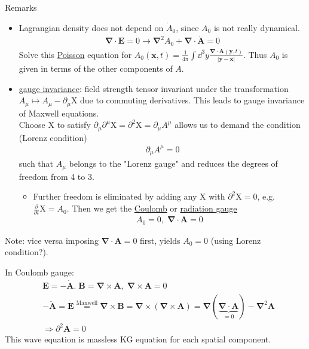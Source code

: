 Remarks
\begin{itemize}
	\item Lagrangian density does not depend on $\dot{A}_0$, since $A_0$ is not really dynamical.
	\begin{align*}
		\pmb{\nabla}\cdot \pmb{E} = 0 \rightarrow \pmb{\nabla}^2 A_0 + \pmb{\nabla}\cdot \dot{\pmb{A}} = 0 
	\end{align*}
	Solve this \underline{Poisson} equation for $A_0(\pmb{x},t) = \frac{1}{4\pi}\int \dd^3 y \frac{\pmb{\nabla}\cdot \dot{\pmb{A}}(\pmb{y},t)}{|\pmb{y}-\pmb{x}|}$. Thus $A_0$ is given in terms of the other components of $A$.
	\item \underline{gauge invariance}: field strength tensor invariant under the transformation $A_\mu \longmapsto A_\mu - \partial_\mu \text{X}$ due to commuting derivatives. This leads to gauge invariance of Maxwell equations.\\
	Choose X to satisfy $\partial_\mu \partial^\mu \text{X} = \partial^2\text{X}=\partial_\mu A^\mu$ allows us to demand the condition  (Lorenz condition)
		\begin{align}
			\partial_\mu A^\mu = 0
		\end{align}
	such that $A_\mu$ belongs to the "Lorenz gauge" and reduces the degrees of freedom from 4 to 3.
	\begin{itemize}
		\item Further freedom is eliminated by adding any X with $\partial^2 \text{X} = 0$, e.g.~$\frac{\partial}{\partial t} \text{X} = A_0$. Then we get the \underline{Coulomb} or \underline{radiation gauge}
		\begin{align}
			A_0 = 0,\; \pmb{\nabla}\cdot \pmb{A} = 0
		\end{align}
	\end{itemize}
\end{itemize}

Note: vice versa imposing $\pmb{\nabla} \cdot \pmb{A} = 0$ first, yields $A_0 = 0$ (using Lorenz condition?).

In Coulomb gauge:
\begin{align*}
	&\pmb{E} = -\dot{\pmb{A}}.\; \pmb{B} = \pmb{\nabla} \times \pmb{A},\; \pmb{\nabla}\times \pmb{A} = 0 \\
	&-\ddot{\pmb{A}} = \dot{\pmb{E}} \stackrel{\text{Maxwell}}{=} \pmb{\nabla} \times \pmb{B} =  \pmb{\nabla} \times (\pmb{\nabla} \times \pmb{A}) = \pmb{\nabla}(\underbrace{\pmb{\nabla}\cdot\pmb{A}}_{=0}) - \pmb{\nabla}^2 \pmb{A} \\
	&\Rightarrow \partial^2 \pmb{A} = 0
\end{align*}
This wave equation is massless KG equation for each spatial component.


